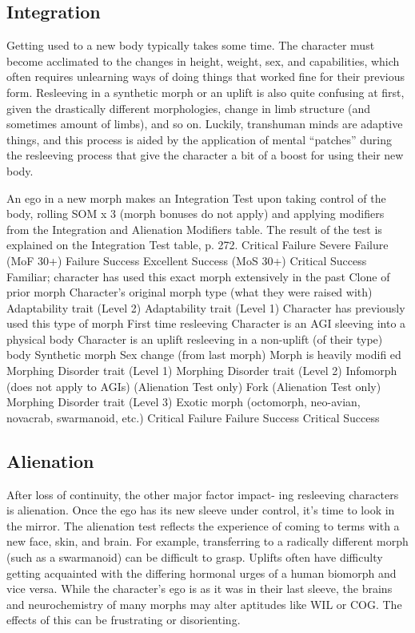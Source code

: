 \subsection{Integration}

Getting used to a new body typically takes some time. 
The character must become acclimated to the changes 
in height, weight, sex, and capabilities, which often 
requires unlearning ways of doing things that worked 
fine for their previous form. Resleeving in a synthetic 
morph or an uplift is also quite confusing at first, 
given the drastically different morphologies, change in 
limb structure (and sometimes amount of limbs), and 
so on. Luckily, transhuman minds are adaptive things, 
and this process is aided by the application of mental 
``patches'' during the resleeving process that give the 
character a bit of a boost for using their new body.

An ego in a new morph makes an Integration Test 
upon taking control of the body, rolling SOM x 3 (morph 
bonuses do not apply) and applying modifiers from the 
Integration and Alienation Modifiers table. The result of 
the test is explained on the Integration Test table, p. 272.
Critical Failure
Severe Failure (MoF 30+)
Failure
Success
Excellent Success (MoS 30+)
Critical Success
Familiar; character has used this exact morph extensively in the past
Clone of prior morph
Character's original morph type (what they were raised with)
Adaptability trait (Level 2)
Adaptability trait (Level 1)
Character has previously used this type of morph
First time resleeving
Character is an AGI sleeving into a physical body
Character is an uplift resleeving in a non-uplift (of their type) body
Synthetic morph
Sex change (from last morph)
Morph is heavily modiﬁ ed
Morphing Disorder trait (Level 1)
Morphing Disorder trait (Level 2)
Infomorph (does not apply to AGIs) (Alienation Test only)
Fork (Alienation Test only)
Morphing Disorder trait (Level 3)
Exotic morph (octomorph, neo-avian, novacrab, swarmanoid, etc.)
Critical Failure
Failure
Success
Critical Success

\subsection{Alienation}

After loss of continuity, the other major factor impact-
ing resleeving characters is alienation. Once the ego 
has its new sleeve under control, it's time to look in 
the mirror. The alienation test reflects the experience of 
coming to terms with a new face, skin, and brain. For 
example, transferring to a radically different morph 
(such as a swarmanoid) can be difficult to grasp. 
Uplifts often have difficulty getting acquainted with 
the differing hormonal urges of a human biomorph 
and vice versa. While the character's ego is as it was 
in their last sleeve, the brains and neurochemistry of 
many morphs may alter aptitudes like WIL or COG. 
The effects of this can be frustrating or disorienting.

